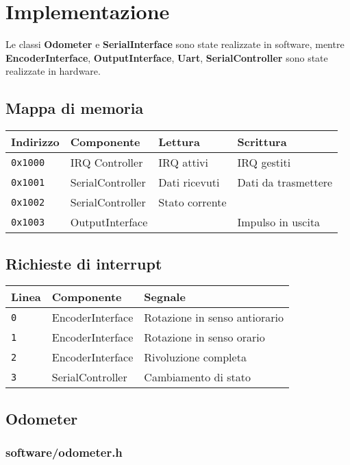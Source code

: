 \documentclass [11pt,a4paper,oneside]{paper}
\newcommand{\component}[1]{\textbf{#1}}
\newcommand{\inputC}[1]{}
\begin{document}
\section{Implementazione}

Le classi \component{Odometer} e \component{SerialInterface} sono state
realizzate in software, mentre \component{EncoderInterface}, 
\component{OutputInterface}, \component{Uart}, \component{SerialController}
sono state realizzate in hardware.

\subsection{Mappa di memoria}
\begin{tabular}{|l|l|l|l|}
\hline
Indirizzo & Componente & Lettura & Scrittura \\
\hline
\texttt{0x1000} & IRQ Controller & IRQ attivi & IRQ gestiti \\
\hline
\texttt{0x1001} & SerialController & Dati ricevuti & Dati da trasmettere \\
\hline
\texttt{0x1002} & SerialController & Stato corrente & \\
\hline
\texttt{0x1003} & OutputInterface & & Impulso in uscita \\
\hline
\end{tabular}

\inputC{software/memory_map.h}

\subsection{Richieste di interrupt}
\begin{tabular}{|l|l|l|}
\hline
Linea & Componente & Segnale \\
\hline
\texttt{0} & EncoderInterface & Rotazione in senso antiorario \\
\hline
\texttt{1} & EncoderInterface & Rotazione in senso orario \\
\hline
\texttt{2} & EncoderInterface & Rivoluzione completa \\
\hline
\texttt{3} & SerialController & Cambiamento di stato \\
\hline
\end{tabular}

\subsection{Odometer}
\subsubsection{software/odometer.h}
\inputC{software/odometer.h}
\end{document}

